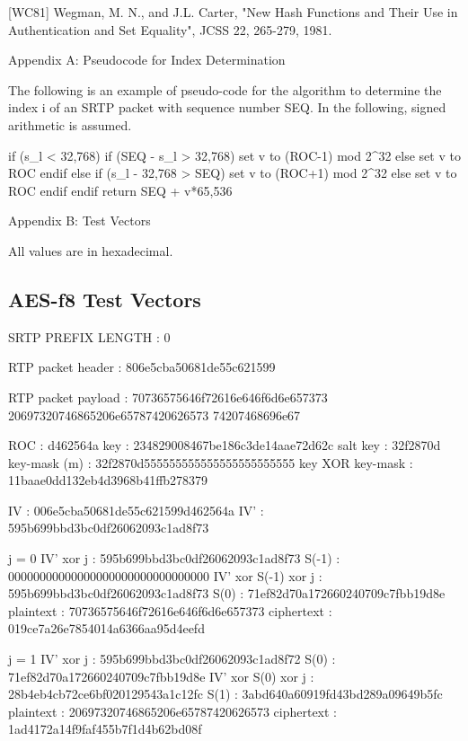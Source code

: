 \documentclass{article}
\begin{document}
[WC81]    Wegman, M. N., and  J.L. Carter, "New Hash Functions and Their Use in Authentication and Set Equality", JCSS 22, 265-279, 1981.

Appendix A: Pseudocode for Index Determination

The following is an example of pseudo-code for the algorithm to determine the index i of an SRTP packet with sequence number SEQ.  In the following, signed arithmetic is assumed.

if (s\_l < 32,768) if (SEQ - s\_l > 32,768) set v to (ROC-1) mod 2\textasciicircum{}32 else set v to ROC endif else if (s\_l - 32,768 > SEQ) set v to (ROC+1) mod 2\textasciicircum{}32 else set v to ROC endif endif return SEQ + v*65,536

Appendix B: Test Vectors

All values are in hexadecimal.

\subsection{AES-f8 Test Vectors}

SRTP PREFIX LENGTH  :   0

RTP packet header   :   806e5cba50681de55c621599

RTP packet payload  :   70736575646f72616e646f6d6e657373 20697320746865206e65787420626573 74207468696e67

ROC                 :   d462564a key                 :   234829008467be186c3de14aae72d62c salt key            :   32f2870d key-mask (m)        :   32f2870d555555555555555555555555 key XOR key-mask    :   11baae0dd132eb4d3968b41ffb278379

IV                  :   006e5cba50681de55c621599d462564a IV'                 :   595b699bbd3bc0df26062093c1ad8f73

j = 0 IV' xor j           :   595b699bbd3bc0df26062093c1ad8f73 S(-1)               :   00000000000000000000000000000000 IV' xor S(-1) xor j :   595b699bbd3bc0df26062093c1ad8f73 S(0)                :   71ef82d70a172660240709c7fbb19d8e plaintext           :   70736575646f72616e646f6d6e657373 ciphertext          :   019ce7a26e7854014a6366aa95d4eefd

j = 1 IV' xor j           :   595b699bbd3bc0df26062093c1ad8f72 S(0)                :   71ef82d70a172660240709c7fbb19d8e IV' xor S(0) xor j  :   28b4eb4cb72ce6bf020129543a1c12fc S(1)                :   3abd640a60919fd43bd289a09649b5fc plaintext           :   20697320746865206e65787420626573 ciphertext          :   1ad4172a14f9faf455b7f1d4b62bd08f
\end{document}
